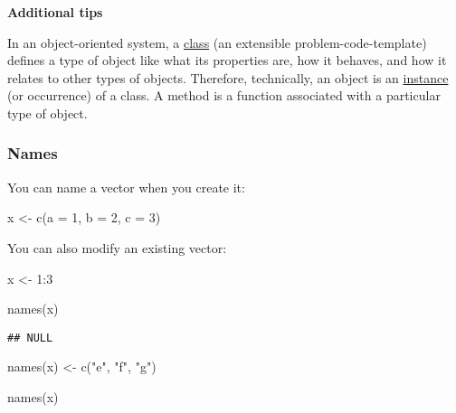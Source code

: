 \documentclass[
]{book}
\newenvironment{Shaded}{\begin{snugshade}}{\end{snugshade}}
\newcommand{\AttributeTok}[1]{\textcolor[rgb]{0.77,0.63,0.00}{#1}}
\newcommand{\DecValTok}[1]{\textcolor[rgb]{0.00,0.00,0.81}{#1}}
\newcommand{\FunctionTok}[1]{\textcolor[rgb]{0.00,0.00,0.00}{#1}}
\newcommand{\NormalTok}[1]{#1}
\newcommand{\OtherTok}[1]{\textcolor[rgb]{0.56,0.35,0.01}{#1}}
\newcommand{\SpecialCharTok}[1]{\textcolor[rgb]{0.00,0.00,0.00}{#1}}
\newcommand{\StringTok}[1]{\textcolor[rgb]{0.31,0.60,0.02}{#1}}
\begin{document}
\textbf{Additional tips}

In an object-oriented system, a \href{https://www.google.com/search?q=what+is+class+programming\&oq=what+is+class+programming\&aqs=chrome.0.0l6.3543j0j4\&sourceid=chrome\&ie=UTF-8}{class} (an extensible problem-code-template) defines a type of object like what its properties are, how it behaves, and how it relates to other types of objects. Therefore, technically, an object is an \href{https://en.wikipedia.org/wiki/Instance_(computer_science)}{instance} (or occurrence) of a class. A method is a function associated with a particular type of object.

\hypertarget{names}{%
\subsubsection{Names}\label{names}}

You can name a vector when you create it:

\begin{Shaded}
\begin{Highlighting}[]
\NormalTok{x }\OtherTok{\textless{}{-}} \FunctionTok{c}\NormalTok{(}\AttributeTok{a =} \DecValTok{1}\NormalTok{, }\AttributeTok{b =} \DecValTok{2}\NormalTok{, }\AttributeTok{c =} \DecValTok{3}\NormalTok{)}
\end{Highlighting}
\end{Shaded}

You can also modify an existing vector:

\begin{Shaded}
\begin{Highlighting}[]
\NormalTok{x }\OtherTok{\textless{}{-}} \DecValTok{1}\SpecialCharTok{:}\DecValTok{3}

\FunctionTok{names}\NormalTok{(x)}
\end{Highlighting}
\end{Shaded}

\begin{verbatim}
## NULL
\end{verbatim}

\begin{Shaded}
\begin{Highlighting}[]
\FunctionTok{names}\NormalTok{(x) }\OtherTok{\textless{}{-}} \FunctionTok{c}\NormalTok{(}\StringTok{"e"}\NormalTok{, }\StringTok{"f"}\NormalTok{, }\StringTok{"g"}\NormalTok{)}

\FunctionTok{names}\NormalTok{(x)}
\end{Highlighting}
\end{Shaded}
\end{document}
